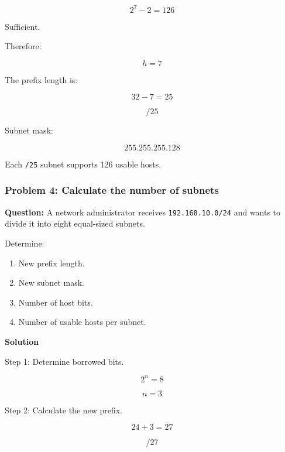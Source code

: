 \[
2^7-2=126
\]



Sufficient.

Therefore:



\[
h=7
\]



The prefix length is:



\[
32-7=25
\]





\[
\boxed{/25}
\]



Subnet mask:



\[
\boxed{255.255.255.128}
\]



Each \texttt{/25} subnet supports 126 usable hosts.

\subsubsection*{Problem 4: Calculate the number of subnets}

\textbf{Question:} A network administrator receives \texttt{192.168.10.0/24} and wants to divide it into eight equal-sized subnets.

Determine:

\begin{enumerate}
\item New prefix length.
\item New subnet mask.
\item Number of host bits.
\item Number of usable hosts per subnet.
\end{enumerate}

\textbf{Solution}

Step 1: Determine borrowed bits.



\[
2^n=8
\]





\[
n=3
\]



Step 2: Calculate the new prefix.



\[
24+3=27
\]





\[
\boxed{/27}
\]



